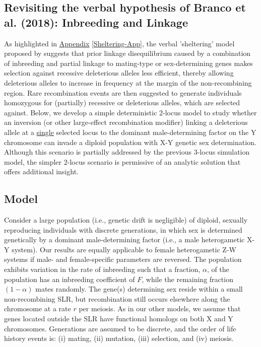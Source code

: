 \documentclass{article}
\begin{document}
\begin{appendices}
\newpage
 \section{Revisiting the verbal hypothesis of Branco et al. (2018): Inbreeding and Linkage} \label{Branco-App}
 \renewcommand{\theequation}{E\arabic{equation}}
 \setcounter{equation}{0}
 \renewcommand{\thefigure}{E\arabic{figure}}
 \setcounter{figure}{0}

As highlighted in \hyperref[Sheltering-App]{Appendix} \ref{Sheltering-App}, the verbal 'sheltering' model proposed by \citet{Branco2017} suggests that prior linkage disequilibrium caused by a combination of inbreeding and partial linkage to mating-type or sex-determining genes makes selection against recessive deleterious alleles less efficient, thereby allowing deleterious alleles to increase in frequency at the margin of the non-recombining region. Rare recombination events are then suggested to generate individuals homozygous for (partially) recessive or deleterious alleles, which are selected against. Below, we develop a simple deterministic 2-locus model to study whether an inversion (or other large-effect recombination modifier) linking a deleterious allele at a \underline{single} selected locus to the dominant male-determining factor on the Y chromosome can invade a diploid population with X-Y genetic sex determination. Although this scenario is partially addressed by the previous 3-locus simulation model, the simpler 2-locus scenario is permissive of an analytic solution that offers additional insight.

\subsection{Model}
Consider a large population (i.e., genetic drift is negligible) of diploid, sexually reproducing individuals with discrete generations, in which sex is determined genetically by a dominant male-determining factor (i.e., a male heterogametic X-Y system). Our results are equally applicable to female heterogametic Z-W systems if male- and female-specific parameters are reversed. The population exhibits variation in the rate of inbreeding such that a fraction, $\alpha$, of the population has an inbreeding coefficient of $F$, while the remaining fraction $(1-\alpha)$ mates randomly. The gene(s) determining sex reside within a small non-recombining SLR, but recombination still occurs elsewhere along the chromosome at a rate $r$ per meiosis. As in our other models, we assume that genes located outside the SLR have functional homologs on both X and Y chromosomes. Generations are assumed to be discrete, and the order of life history events is: (i) mating, (ii) mutation, (iii) selection, and (iv) meiosis. 


\end{appendices}
\end{document}
